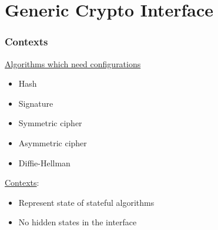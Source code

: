 \section{Generic Crypto Interface}


\begin{frame}

\frametitle{Contexts}

\underline{Algorithms which need configurations}
\begin{itemize}
  \item \footnotesize{Hash}
  \item \footnotesize{Signature}
  \item \footnotesize{Symmetric cipher}
  \item \footnotesize{Asymmetric cipher}
  \item \footnotesize{Diffie-Hellman}
\end{itemize}

\vspace{0.25cm}

\underline{Contexts}:
\begin{itemize}
  \item \footnotesize{Represent state of stateful algorithms}
  \item \footnotesize{No hidden states in the interface}
\end{itemize}

\end{frame}


